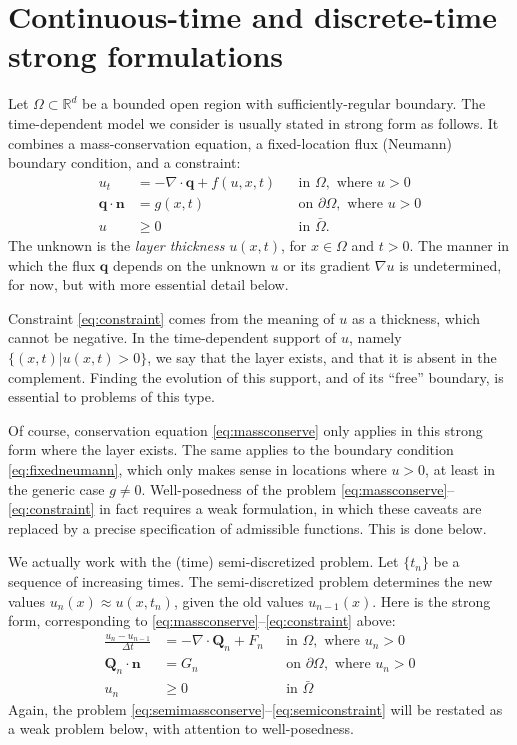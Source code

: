 \documentclass[final,leqno,onefignum,onetabnum]{siamltex1213bueler}
\newcommand\bn{\mathbf{n}}
\newcommand\bq{\mathbf{q}}
\newcommand\bQ{\mathbf{Q}}
\newcommand{\Div}{\nabla\cdot}
\renewcommand{\grad}{\nabla}
\newcommand\RR{\mathbb{R}}
\begin{document}
\section{Continuous-time and discrete-time strong formulations}  Let $\Omega \subset \RR^d$ be a bounded open region with sufficiently-regular boundary.  The time-dependent model we consider is usually stated in strong form as follows.  It combines a mass-conservation equation, a fixed-location flux (Neumann) boundary condition, and a constraint:
\begin{align}
u_t &= - \Div \bq + f(u,x,t) &&\text{in } \Omega, \text{ where } u > 0 \label{eq:massconserve} \\
\bq \cdot \bn &= g(x,t) &&\text{on } \partial\Omega, \text{ where } u > 0 \label{eq:fixedneumann} \\
u &\ge 0 &&\text{in } \bar\Omega. \label{eq:constraint}
\end{align}
The unknown is the \emph{layer thickness} $u(x,t)$, for $x\in \Omega$ and $t>0$.  The manner in which the flux $\bq$ depends on the unknown $u$ or its gradient $\grad u$ is undetermined, for now, but with more essential detail below.

Constraint \eqref{eq:constraint} comes from the meaning of $u$ as a thickness, which cannot be negative.  In the time-dependent support of $u$, namely $\{(x,t) \big| u(x,t) > 0\}$, we say that the layer exists, and that it is absent in the complement.  Finding the evolution of this support, and of its ``free'' boundary, is essential to problems of this type.

Of course, conservation equation \eqref{eq:massconserve} only applies in this strong form where the layer exists.  The same applies to the boundary condition \eqref{eq:fixedneumann}, which only makes sense in locations where $u>0$, at least in the generic case $g\ne 0$.  Well-posedness of the problem \eqref{eq:massconserve}--\eqref{eq:constraint} in fact requires a weak formulation, in which these caveats are replaced by a precise specification of admissible functions.  This is done below.

We actually work with the (time) semi-discretized problem.  Let $\{t_n\}$ be a sequence of increasing times.  The semi-discretized problem determines the new values $u_n(x) \approx u(x,t_n)$, given the old values $u_{n-1}(x)$.  Here is the strong form, corresponding to \eqref{eq:massconserve}--\eqref{eq:constraint} above:
\begin{align}
\frac{u_n - u_{n-1}}{\Delta t} &= - \Div \bQ_n + F_n &&\text{in } \Omega, \text{ where } u_n > 0 \label{eq:semimassconserve} \\
\bQ_n \cdot \bn &= G_n &&\text{on } \partial\Omega, \text{ where } u_n > 0 \label{eq:semifixedneumann} \\
u_n &\ge 0 &&\text{in } \bar\Omega \label{eq:semiconstraint}
\end{align}
Again, the problem \eqref{eq:semimassconserve}--\eqref{eq:semiconstraint} will be restated as a weak problem below, with attention to well-posedness.
\end{document}
